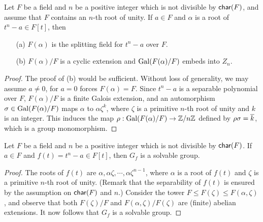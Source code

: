\begin{prop}\label{radical -> cyclic}
    Let $F$ be a field and $n$ be a positive integer which is not divisible by ${\textsf{char}({F})}$, and assume that $F$ contains an $n$-th root of unity.
    If $a\in F$ and $\alpha$ is a root of $t^n-a\in F[t]$, then
    \begin{enumerate}
        \item[(a)]
        {
            $F(\alpha)$ is the splitting field for $t^n-a$ over $F$.
        }
        \item[(b)]
        {
            $F(\alpha)/F$ is a cyclic extension and ${\textrm{Gal}({F(\alpha)/F})}$ embeds into $Z_n$.
        }
    \end{enumerate}
\end{prop}
\begin{proof}
    The proof of (b) would be sufficient.
    Without loss of generality, we may assume $a\neq 0$, for $a=0$ forces $F(\alpha)=F$.
    Since $t^n-a$ is a separable polynomial over $F$, $F(\alpha)/F$ is a finite Galois extension, and an automorphism $\sigma\in{\textrm{Gal}({F(\alpha)/F})}$ maps $\alpha$ to $\alpha\zeta^k$, where $\zeta$ is a primitive $n$-th root of unity and $k$ is an integer.
    This induces the map $\rho: {\textrm{Gal}({F(\alpha)/F})}\rightarrow {\mathbb{Z}}/n{\mathbb{Z}}$ defined by $\rho\sigma=\overline{k}$, which is a group monomorphism.
\end{proof}
\begin{cor}
    Let $F$ be a field and $n$ be a positive integer which is not divisible by ${\textsf{char}({F})}$.
    If $a\in F$ and $f(t)=t^n-a\in F[t]$, then $G_f$ is a solvable group.
\end{cor}
\begin{proof}
    The roots of $f(t)$ are $\alpha, \alpha\zeta, \cdots, \alpha\zeta^{n-1}$, where $\alpha$ is a root of $f(t)$ and $\zeta$ is a primitive $n$-th root of unity. (Remark that the separability of $f(t)$ is ensured by the assumption on ${\textsf{char}({F})}$ and $n$.)
    Consider the tower $F\leq F(\zeta)\leq F(\alpha, \zeta)$, and observe that both $F(\zeta)/F$ and $F(\alpha, \zeta)/F(\zeta)$ are (finite) abelian extensions.
    It now follows that $G_f$ is a solvable group.
\end{proof}

